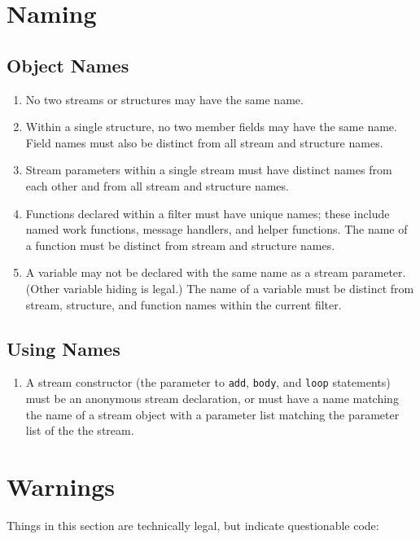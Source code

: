\documentclass[11pt]{article}
\begin{document}
\section{Naming}

\subsection{Object Names}

\begin{enumerate}
\item No two streams or structures may have the same name.
\item Within a single structure, no two member fields may have the
  same name.  Field names must also be distinct from all stream and
  structure names.
\item Stream parameters within a single stream must have distinct
  names from each other and from all stream and structure names.
\item Functions declared within a filter must have unique names; these
  include named work functions, message handlers, and helper
  functions.  The name of a function must be distinct from stream and
  structure names.
\item A variable may not be declared with the same name as a stream
  parameter.  (Other variable hiding is legal.)  The name of a
  variable must be distinct from stream, structure, and function
  names within the current filter.
\end{enumerate}

\subsection{Using Names}

\begin{enumerate}
\item A stream constructor (the parameter to \lstinline|add|,
  \lstinline|body|, and \lstinline|loop| statements) must be an
  anonymous stream declaration, or must have a name matching the name
  of a stream object with a parameter list matching the parameter list
  of  the the stream.
\end{enumerate}

\section{Warnings}

Things in this section are technically legal, but indicate
questionable code:
\end{document}
